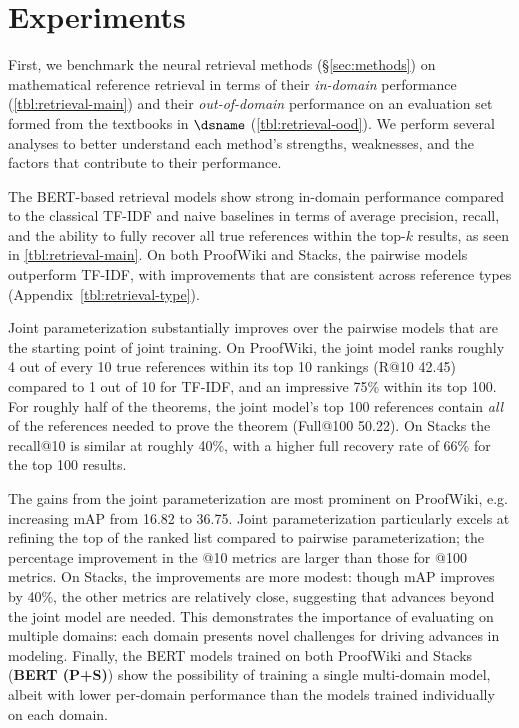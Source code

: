 \section{Experiments}
\label{sec:experiments}
First, we benchmark the neural retrieval methods (\S\ref{sec:methods}) on mathematical reference retrieval in terms of their \textit{in-domain} performance (\autoref{tbl:retrieval-main}) and their \textit{out-of-domain} performance on an evaluation set formed from the textbooks in $\dsname$ (\autoref{tbl:retrieval-ood}).
We perform several analyses to better understand each method’s strengths, weaknesses, and the factors that contribute to their performance.

 The BERT-based retrieval models show strong in-domain performance compared to the classical TF-IDF and naive baselines in terms of average precision, recall, and the ability to fully recover all true references within the top-$k$ results, as seen in \autoref{tbl:retrieval-main}.
On both ProofWiki and Stacks, the pairwise models outperform TF-IDF, with improvements that are consistent across reference types (Appendix~\autoref{tbl:retrieval-type}).

Joint parameterization substantially improves over the pairwise models that are the starting point of joint training.
On ProofWiki, the joint model ranks roughly 4 out of every 10 true references within its top 10 rankings (R@10 42.45) compared to 1 out of 10 for TF-IDF, and an impressive 75\% within its top 100.
For roughly half of the theorems, the joint model's top 100 references contain \textit{all} of the references 
needed to prove the theorem (Full@100 50.22).
On Stacks the recall@10 is similar at roughly 40\%, with a higher full recovery rate of 66\% for the top 100 results.

The gains from the joint parameterization are most prominent on ProofWiki, e.g. increasing mAP from 16.82 to 36.75.
Joint parameterization particularly excels at refining the top of the ranked list compared to pairwise parameterization; the percentage improvement in the @10 metrics are larger than those for @100 metrics.
On Stacks, the improvements are more modest: though mAP improves by 40\%, the other metrics are relatively close, suggesting that advances beyond the joint model are needed.
This demonstrates the importance of evaluating on multiple domains: each domain presents novel challenges for driving advances in modeling.
Finally, the BERT models trained on both ProofWiki and Stacks (\textbf{BERT (P+S)}) show the possibility of training a single multi-domain model, albeit with lower per-domain performance than the models trained individually on each domain.

